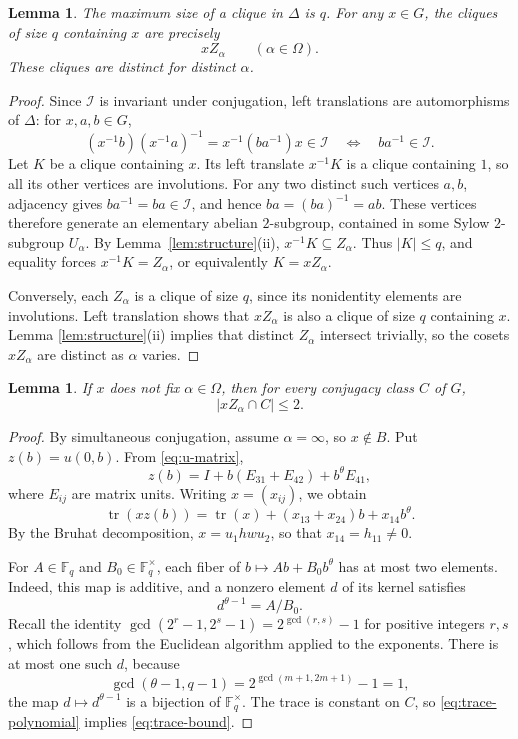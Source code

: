 \documentclass[11pt]{amsart}
\numberwithin{equation}{section}
\newtheorem{lemma}[theorem]{Lemma}
\theoremstyle{definition}
\theoremstyle{remark}
\newcommand{\tr}{\operatorname{tr}}
\newcommand{\F}{\mathbb F}
\newcommand{\I}{\mathcal I}
\begin{document}
\begin{lemma}\label{lem:cliques}
The maximum size of a clique in $\Delta$ is $q$. For any $x\in G$,
the cliques of size $q$ containing $x$ are precisely
\[
 xZ_\alpha\qquad(\alpha\in\Omega).
\]
These cliques are distinct for distinct $\alpha$.
\end{lemma}
\begin{proof}
Since $\I$ is invariant under conjugation, left translations are
automorphisms of $\Delta$: for $x,a,b\in G$,
\[
 (x^{-1}b)(x^{-1}a)^{-1}=x^{-1}(ba^{-1})x\in\I
 \quad\Longleftrightarrow\quad ba^{-1}\in\I.
\]
Let $K$ be a clique containing $x$. 
Its left translate $x^{-1}K$ is a clique containing $1$, so all its other vertices are involutions.
For any two distinct such vertices $a,b$, adjacency gives $ba^{-1}=ba\in\I$, and hence $ba=(ba)^{-1}=ab$. 
These vertices therefore generate an elementary abelian $2$-subgroup, contained in some Sylow $2$-subgroup $U_\alpha$. 
By Lemma~\ref{lem:structure}(ii), $x^{-1}K\subseteq Z_\alpha$. 
Thus $|K|\leq q$, and equality forces $x^{-1}K=Z_\alpha$, or equivalently $K=xZ_\alpha$.

Conversely, each $Z_\alpha$ is a clique of size $q$, since its nonidentity elements are involutions. 
Left translation shows that $xZ_\alpha$ is also a clique of size $q$ containing $x$.
Lemma \ref{lem:structure}(ii) implies that distinct $Z_{\alpha}$ intersect trivially, so the cosets \(xZ_\alpha\) are distinct as \(\alpha\) varies.
\end{proof}

\begin{lemma}\label{lem:trace}
If $x$ does not fix $\alpha\in\Omega$, then for every conjugacy
class $C$ of $G$,
\begin{equation}\label{eq:trace-bound}
 |xZ_\alpha\cap C|\leq2.
\end{equation}
\end{lemma}
\begin{proof}
By simultaneous conjugation, assume $\alpha=\infty$, so $x\notin B$.
Put $z(b)=u(0,b)$. From \eqref{eq:u-matrix},
\[
 z(b)=I+b(E_{31}+E_{42})+b^\theta E_{41},
\]
where $E_{ij}$ are matrix units.
Writing $x=(x_{ij})$, we obtain
\begin{equation}\label{eq:trace-polynomial}
 \tr(xz(b))=\tr(x)+(x_{13}+x_{24})b+x_{14}b^\theta.
\end{equation}
By the Bruhat decomposition, $x=u_1hw u_2$, so that $x_{14}=h_{11}\ne0$.

For $A\in\F_q$ and $B_0\in\F_q^\times$, each fiber of
$b\mapsto Ab+B_0b^\theta$ has at most two elements. Indeed, this
map is additive, and a nonzero element $d$ of its kernel satisfies
\[
 d^{\theta-1}=A/B_0.
\]
Recall the identity
$\gcd(2^r-1,2^s-1)=2^{\gcd(r,s)}-1$ for positive integers $r,s$,
which follows from the Euclidean algorithm applied to the exponents.
There is at most one such $d$, because
\[
 \gcd(\theta-1,q-1)
 =2^{\gcd(m+1,2m+1)}-1=1,
\]
the map \(d\mapsto d^{\theta-1}\) is a bijection of \(\mathbb F_q^\times\).
The trace is constant on $C$, so \eqref{eq:trace-polynomial} implies
\eqref{eq:trace-bound}.
\end{proof}
\end{document}

